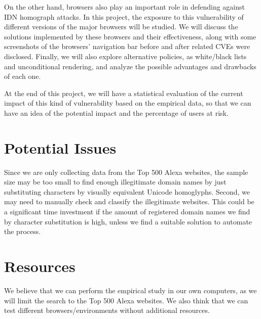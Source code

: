 \documentclass[letterpaper,twocolumn,10pt]{article}
\begin{document}
On the other hand, browsers also play an important role in defending against IDN homograph attacks.
In this project, the exposure to this vulnerability of different versions of the major browsers will be studied.
We will discuss the solutions implemented by these browsers and their effectiveness, along with some screenshots of the browsers' navigation bar before and after related CVEs were disclosed.
Finally, we will also explore alternative policies, as white/black lists and unconditional rendering, and analyze the possible advantages and drawbacks of each one.

At the end of this project, we will have a statistical evaluation of the current impact of this kind of vulnerability based on the empirical data, so that we can have an idea of the potential impact and the percentage of users at risk.

\section{Potential Issues}
Since we are only collecting data from the Top 500 Alexa websites, the sample size may be too small to find enough illegitimate domain names by just substituting characters by visually equivalent Unicode homoglyphs.
Second, we may need to manually check and classify the illegitimate websites.
This could be a significant time investment if the amount of registered domain names we find by character substitution is high, unless we find a suitable solution to automate the process.

\section{Resources}
We believe that we can perform the empirical study in our own computers, as we will limit the search to the Top 500 Alexa websites.
We also think that we can test different browsers/environments without additional resources.
\end{document}
